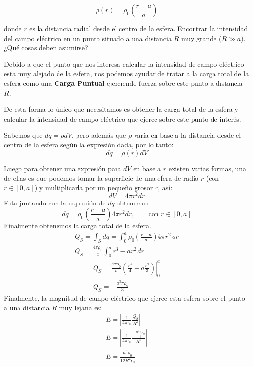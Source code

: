 \documentclass[11pt]{article}
\begin{document}
\begin{equation*}
    \rho(r) = \rho_0 \left( \frac{r - a}{a} \right)
\end{equation*}

donde $r$ es la distancia radial desde el centro de la esfera. Encontrar la intensidad del campo eléctrico en un punto situado a una distancia $R$ muy grande ($R \gg a$). ¿Qué cosas deben asumirse?

\begin{solucion}
    Debido a que el punto que nos interesa calcular la intensidad de campo eléctrico esta muy alejado de la esfera, nos podemos ayudar de tratar a la carga total de la esfera como una \textbf{Carga Puntual} ejerciendo fuerza sobre este punto a distancia $R$.

    De esta forma lo único que necesitamos es obtener la carga total de la esfera y calcular la intensidad de campo eléctrico que ejerce sobre este punto de interés.

    Sabemos que $dq = \rho dV$, pero además que $\rho$ varía en base a la distancia desde el centro de la esfera según la expresión dada, por lo tanto:
    \begin{equation}
        dq = \rho(r)dV
    \end{equation}

    Luego para obtener una expresión para $dV$ en base a $r$ existen varias formas, una de ellas es que podemos tomar la superficie de una efera de radio $r$ (con $r\in[0, a]$) y multiplicarla por un pequeño grosor $r$, así:
    \begin{equation}
        dV = 4\pi r^2 dr
    \end{equation}
    Esto juntando con la expresión de $dq$ obtenemos
    \begin{equation}
        dq = \rho_0 \left( \frac{r - a}{a} \right) 4\pi r^2 dr, \qquad \text{con } r\in[0, a]
    \end{equation}
    Finalmente obtenemos la carga total de la esfera.
    \begin{align}
        Q_S = \int_S dq = \int_{0}^{a} \rho_0 \left( \frac{r - a}{a} \right)4\pi r^2 \,dr
        \\
        Q_S = \frac{4\pi\rho_0}{a} \int_{0}^{a} r^3-ar^2\,dr
    \end{align}
    \begin{align}
        Q_S = \frac{4\pi\rho_0}{a} \left.\left(\frac{r^4}{4}-a\frac{r^3}{3}\right)\right|_0^a
        \\
        Q_S = -\frac{a^3\pi\rho_0}{3}
    \end{align}
    Finalmente, la magnitud de campo eléctrico que ejerce esta esfera sobre el punto a una distancia $R$ muy lejana es:
    \begin{align}
        E = \left|\frac{1}{4\pi\epsilon_0} \frac{Q_S}{R^2}\right|
        \\
        E = \left|\frac{1}{4\pi\epsilon_0} \frac{-\frac{a^3\pi\rho_0}{3}}{R^2}\right|
        \\
        E = \frac{a^3\rho_0}{12R^2\epsilon_0}
    \end{align}
\end{solucion}
\end{document}
